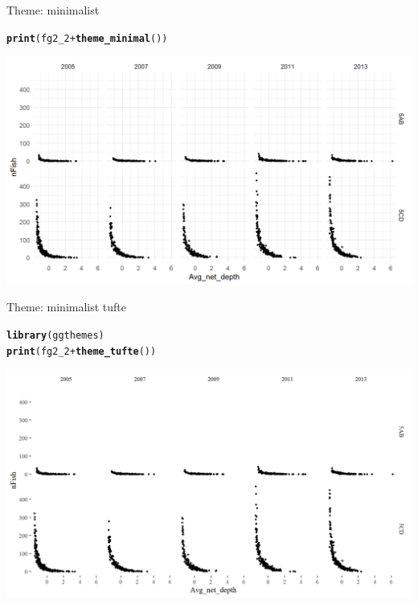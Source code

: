 \documentclass{beamer}\usepackage[]{graphicx}\usepackage[]{color}
\makeatletter
\newcommand{\hlopt}[1]{\textcolor[rgb]{0,0,0}{#1}}%
\newcommand{\hlstd}[1]{\textcolor[rgb]{0.345,0.345,0.345}{#1}}%
\newcommand{\hlkwd}[1]{\textcolor[rgb]{0.737,0.353,0.396}{\textbf{#1}}}%
\newenvironment{kframe}{%
 \def\at@end@of@kframe{}%
 \ifinner\ifhmode%
  \def\at@end@of@kframe{\end{minipage}}%
  \begin{minipage}{\columnwidth}%
 \fi\fi%
 \def\FrameCommand##1{\hskip\@totalleftmargin \hskip-\fboxsep
 \colorbox{shadecolor}{##1}\hskip-\fboxsep
     \hskip-\linewidth \hskip-\@totalleftmargin \hskip\columnwidth}%
 \MakeFramed {\advance\hsize-\width
   \@totalleftmargin\z@ \linewidth\hsize
   \@setminipage}}%
 {\par\unskip\endMakeFramed%
 \at@end@of@kframe}
\newenvironment{knitrout}{}{} %
\makeatother
\begin{document}
\begin{frame}[fragile]{Theme: minimalist}
\begin{knitrout}\footnotesize
{}\color{fgcolor}\begin{kframe}
\begin{alltt}
\hlkwd{print}\hlstd{(fg2_2} \hlopt{+}  \hlkwd{theme_minimal}\hlstd{())}
\end{alltt}
\end{kframe}

{\centering \includegraphics[width=.9\linewidth]{figure/theme_4-1} 

}



\end{knitrout}
\end{frame}


\begin{frame}[fragile]{Theme: minimalist tufte}
\begin{knitrout}\footnotesize
{}\color{fgcolor}\begin{kframe}
\begin{alltt}
\hlkwd{library}\hlstd{(ggthemes)}
\hlkwd{print}\hlstd{(fg2_2} \hlopt{+}  \hlkwd{theme_tufte}\hlstd{())}
\end{alltt}
\end{kframe}

{\centering \includegraphics[width=.9\linewidth]{figure/theme_5-1} 

}



\end{knitrout}
\end{frame}
\end{document}

